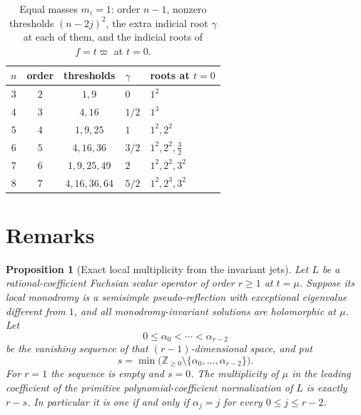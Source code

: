 \documentclass[11pt,a4paper]{article}
\newtheorem{proposition}[theorem]{Proposition}
\theoremstyle{definition}
\theoremstyle{remark}
\numberwithin{equation}{section}
\begin{document}
\begin{table}[ht]
\centering
\caption{Equal masses $m_i=1$: order $n-1$, nonzero thresholds $(n-2j)^2$, the extra indicial root $\gamma$ at each of them, and the indicial roots of $f=t\varpi$ at $t=0$.}\label{bs:tab:equal}
\begin{tabular}{@{}cccll@{}}
\toprule
$n$ & order & thresholds & $\gamma$ & roots at $t=0$\\
\midrule
$3$ & $2$ & $1,9$ & $0$ & $1^2$\\
$4$ & $3$ & $4,16$ & $1/2$ & $1^3$\\
$5$ & $4$ & $1,9,25$ & $1$ & $1^2,2^2$\\
$6$ & $5$ & $4,16,36$ & $3/2$ & $1^2,2^2,\frac32$\\
$7$ & $6$ & $1,9,25,49$ & $2$ & $1^2,2^2,3^2$\\
$8$ & $7$ & $4,16,36,64$ & $5/2$ & $1^2,2^3,3^2$\\
\bottomrule
\end{tabular}
\end{table}

\section{Remarks}\label{bs:sec:remarks}

\begin{proposition}[Exact local multiplicity from the invariant jets]\label{bs:prop:jetdefect}
Let $L$ be a rational-coefficient Fuchsian scalar operator of order $r\ge1$ at $t=\mu$. Suppose its local monodromy is a semisimple pseudo-reflection with exceptional eigenvalue different from $1$, and all monodromy-invariant solutions are holomorphic at $\mu$. Let
\[
0\le\alpha_0<\cdots<\alpha_{r-2}
\]
be the vanishing sequence of that $(r-1)$-dimensional space, and put
\[
s=\min\bigl(\mathbb Z_{\ge0}\setminus\{\alpha_0,\ldots,\alpha_{r-2}\}\bigr).
\]
For $r=1$ the sequence is empty and $s=0$. The multiplicity of $\mu$ in the leading coefficient of the primitive polynomial-coefficient normalization of $L$ is exactly $r-s$. In particular it is one if and only if $\alpha_j=j$ for every $0\le j\le r-2$.
\end{proposition}
\end{document}

